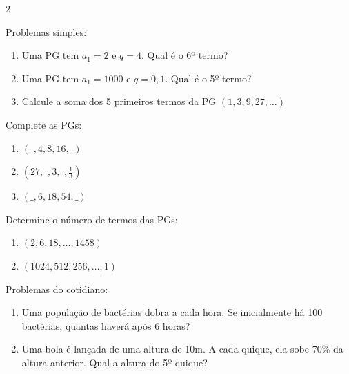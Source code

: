 \documentclass[11pt]{article}
\begin{document}
\begin{multicols}{2}

\item Problemas simples:
\begin{enumerate}[label=\alph*)]
\item Uma PG tem $a_1 = 2$ e $q = 4$. Qual é o 6º termo?
\item Uma PG tem $a_1 = 1000$ e $q = 0,1$. Qual é o 5º termo?
\item Calcule a soma dos 5 primeiros termos da PG $(1, 3, 9, 27, \ldots)$
\end{enumerate}

\item Complete as PGs:
\begin{enumerate}[label=\alph*)]
\item $( \_, 4, 8, 16, \_ )$
\item $(27, \_, 3, \_, \frac{1}{3})$
\item $( \_, 6, 18, 54, \_ )$
\end{enumerate}

\item Determine o número de termos das PGs:
\begin{enumerate}[label=\alph*)]
\item $(2, 6, 18, \ldots, 1458)$
\item $(1024, 512, 256, \ldots, 1)$
\end{enumerate}

\item Problemas do cotidiano:
\begin{enumerate}[label=\alph*)]
\item Uma população de bactérias dobra a cada hora. Se inicialmente há 100 bactérias, quantas haverá após 6 horas?
\item Uma bola é lançada de uma altura de 10m. A cada quique, ela sobe 70\% da altura anterior. Qual a altura do 5º quique?
\end{enumerate}

\end{multicols}
\end{document}
